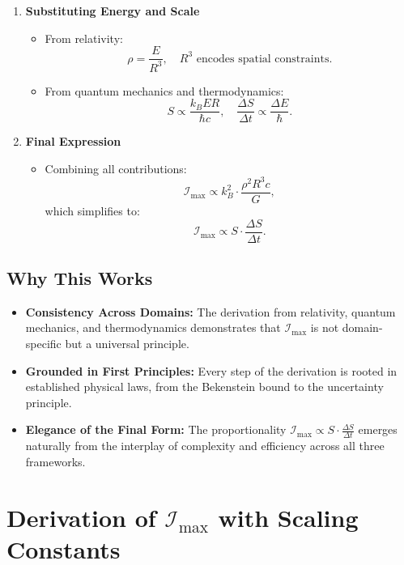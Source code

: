 \documentclass[12pt]{article}
\begin{document}
\begin{enumerate}
    \item \textbf{Substituting Energy and Scale}
    \begin{itemize}
        \item From relativity:
        \[
        \rho = \frac{E}{R^3}, \quad R^3 \text{ encodes spatial constraints.}
        \]
        \item From quantum mechanics and thermodynamics:
        \[
        S \propto \frac{k_B E R}{\hbar c}, \quad \frac{\Delta S}{\Delta t} \propto \frac{\Delta E}{\hbar}.
        \]
    \end{itemize}

    \item \textbf{Final Expression}
    \begin{itemize}
        \item Combining all contributions:
        \[
        \mathcal{I}_{\text{max}} \propto k_B^2 \cdot \frac{\rho^2 R^3 c}{G},
        \]
        which simplifies to:
        \[
        \mathcal{I}_{\text{max}} \propto S \cdot \frac{\Delta S}{\Delta t}.
        \]
    \end{itemize}
\end{enumerate}

\subsection{Why This Works}
\begin{itemize}
    \item \textbf{Consistency Across Domains:} The derivation from relativity, quantum mechanics, and thermodynamics demonstrates that \(\mathcal{I}_{\text{max}}\) is not domain-specific but a universal principle.
    \item \textbf{Grounded in First Principles:} Every step of the derivation is rooted in established physical laws, from the Bekenstein bound to the uncertainty principle.
    \item \textbf{Elegance of the Final Form:} The proportionality \(\mathcal{I}_{\text{max}} \propto S \cdot \frac{\Delta S}{\Delta t}\) emerges naturally from the interplay of complexity and efficiency across all three frameworks.
\end{itemize}


\section{Derivation of $\mathcal{I}_{\text{max}}$ with Scaling Constants}
\end{document}
